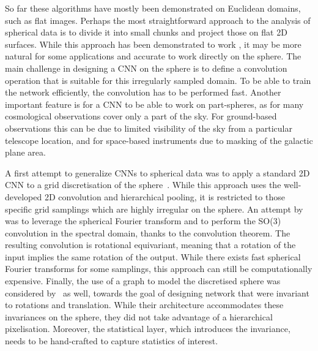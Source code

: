 \documentclass[final,twocolumn,3p,times,authoryear]{elsarticle}
\newcommand{\todo}[1]{{\color[rgb]{.6,.1,.6}{#1}}}
\newcommand{\1}{\b{1}}              %
\newcommand{\0}{\b{0}}              %
\begin{document}
So far these algorithms have mostly been demonstrated on Euclidean domains, such as flat images.
Perhaps the most straightforward approach to the analysis of spherical data is to divide it into small chunks and project those on flat 2D surfaces.
While this approach has been demonstrated to work \citep{fluri2018deep,gupta2018nongaussianinformation,schmelze2017cosmologicalmodel,gillet2018deeplearning}, it may be more natural for some applications and accurate to work directly on the sphere.
The main challenge in designing a CNN on the sphere is to define a convolution operation that is suitable for this irregularly sampled domain.
To be able to train the network efficiently, the convolution has to be performed fast.
Another important feature is for a CNN to be able to work on part-spheres, as for many cosmological observations cover only a part of the sky.
For ground-based observations this can be due to limited visibility of the sky from a particular telescope location, and for space-based instruments due to masking of the galactic plane area.


A first attempt to generalize CNNs to spherical data was to apply a standard 2D CNN to a grid discretisation of the sphere~\citep{boomsma2017spherical}. While this approach uses the well-developed 2D convolution and hierarchical pooling, it is restricted to those specific grid samplings which are highly irregular on the sphere.
An attempt by~\citet{cohen2018spherical} was to leverage the spherical Fourier transform and to perform the SO(3) convolution in the spectral domain, thanks to the convolution theorem. 
The resulting convolution is rotational equivariant, meaning that a rotation of the input implies the same rotation of the output.
While there exists fast spherical Fourier transforms for some samplings, this approach can still be computationally expensive.
\todo{Add here the paper of Risi?}
Finally, the use of a graph to model the discretised sphere was considered by~\citet{khasanova2017graphomni} as well, towards the goal of designing network that were invariant to rotations and translation.
While their architecture accommodates these invariances on the sphere, they did not take advantage of a hierarchical pixelisation.
Moreover, the statistical layer, which introduces the invariance, needs to be hand-crafted to capture statistics of interest.
\end{document}
